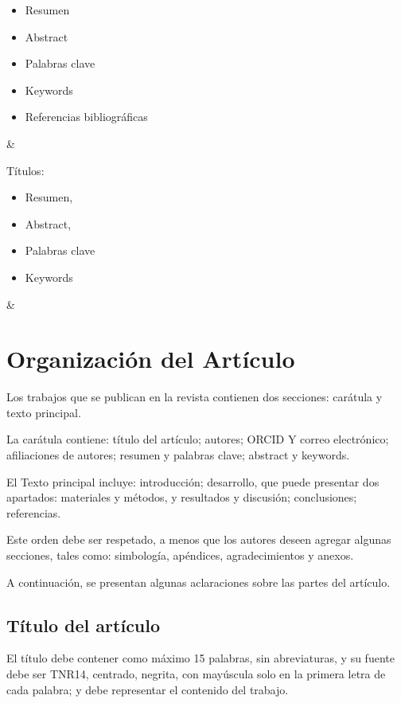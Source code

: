 \documentclass[a4paper, 12pt]{article}
\begin{document}
\begin{table}[htbp]
\begin{tblr}
{\begin{itemize}[nosep, leftmargin=*]
         \item Resumen
         \item Abstract
         \item Palabras clave
         \item Keywords
         \item Referencias bibliográficas
         \end{itemize}} &  {Títulos:\itshape
                          \begin{itemize}[nosep, leftmargin=*]
                          \item Resumen,
                          \item Abstract,
                          \item Palabras clave
                          \item Keywords
                          \end{itemize}} & \\
  \end{tblr}
\end{table}

\section{Organización del Artículo}

Los trabajos que se publican en la revista contienen dos secciones: carátula y
texto principal.

La carátula contiene: título del artículo; autores; ORCID Y correo electrónico;
afiliaciones de autores; resumen y palabras clave; abstract y keywords.

El Texto principal incluye: introducción; desarrollo, que puede presentar dos
apartados: materiales y métodos, y resultados y discusión; conclusiones;
referencias.

Este orden debe ser respetado, a menos que los autores deseen agregar algunas
secciones, tales como: simbología, apéndices, agradecimientos y anexos.

A continuación, se presentan algunas aclaraciones sobre las partes del artículo.

\subsection{Título del artículo}

El título debe contener como máximo 15 palabras, sin abreviaturas, y su fuente
debe ser TNR14, centrado, negrita, con mayúscula solo en la primera letra de
cada palabra; y debe representar el contenido del trabajo.
\end{document}
